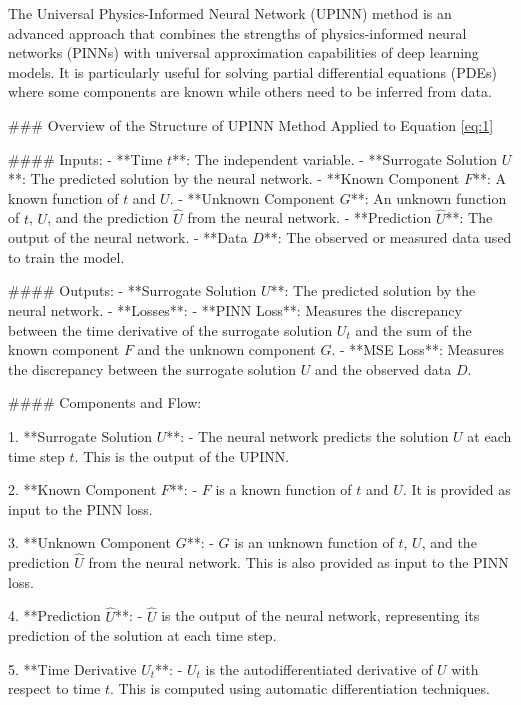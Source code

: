 The Universal Physics-Informed Neural Network (UPINN) method is an advanced approach that combines the strengths of physics-informed neural networks (PINNs) with universal approximation capabilities of deep learning models. It is particularly useful for solving partial differential equations (PDEs) where some components are known while others need to be inferred from data.

### Overview of the Structure of UPINN Method Applied to Equation \eqref{eq:1}

#### Inputs:
- **Time \( t \)**: The independent variable.
- **Surrogate Solution \( U \)**: The predicted solution by the neural network.
- **Known Component \( F \)**: A known function of \( t \) and \( U \).
- **Unknown Component \( G \)**: An unknown function of \( t \), \( U \), and the prediction \( \hat{U} \) from the neural network.
- **Prediction \( \hat{U} \)**: The output of the neural network.
- **Data \( D \)**: The observed or measured data used to train the model.

#### Outputs:
- **Surrogate Solution \( U \)**: The predicted solution by the neural network.
- **Losses**:
  - **PINN Loss**: Measures the discrepancy between the time derivative of the surrogate solution \( U_t \) and the sum of the known component \( F \) and the unknown component \( G \).
  - **MSE Loss**: Measures the discrepancy between the surrogate solution \( U \) and the observed data \( D \).

#### Components and Flow:

1. **Surrogate Solution \( U \)**:
   - The neural network predicts the solution \( U \) at each time step \( t \). This is the output of the UPINN.

2. **Known Component \( F \)**:
   - \( F \) is a known function of \( t \) and \( U \). It is provided as input to the PINN loss.

3. **Unknown Component \( G \)**:
   - \( G \) is an unknown function of \( t \), \( U \), and the prediction \( \hat{U} \) from the neural network. This is also provided as input to the PINN loss.

4. **Prediction \( \hat{U} \)**:
   - \( \hat{U} \) is the output of the neural network, representing its prediction of the solution at each time step.

5. **Time Derivative \( U_t \)**:
   - \( U_t \) is the autodifferentiated derivative of \( U \) with respect to time \( t \). This is computed using automatic differentiation techniques.

